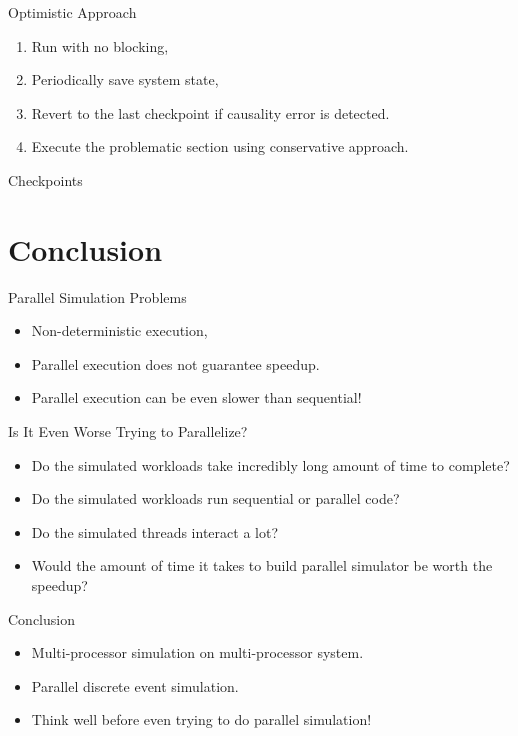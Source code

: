 \begin{frame}{Optimistic Approach}
  \begin{enumerate}
    \item Run with no blocking,
    \item Periodically save system state,
    \item Revert to the last checkpoint if causality error is detected.
    \item Execute the problematic section using conservative approach.
  \end{enumerate}
\end{frame}

\begin{frame}{Checkpoints}
  \centering
\end{frame}

\section*{Conclusion}

\begin{frame}{Parallel Simulation Problems}
  \begin{itemize}
    \item Non-deterministic execution,
    \item Parallel execution does not guarantee speedup. \pause
    \item Parallel execution can be even slower than sequential!
  \end{itemize}
\end{frame}

\begin{frame}{Is It Even Worse Trying to Parallelize?}
  \begin{itemize}
    \item Do the simulated workloads take incredibly long amount of time to
      complete?
    \item Do the simulated workloads run sequential or parallel code?
    \item Do the simulated threads interact a lot? \pause
    \item Would the amount of time it takes to build parallel simulator be
      worth the speedup?
  \end{itemize}
\end{frame}

\begin{frame}{Conclusion}
  \begin{itemize}
    \item Multi-processor simulation on multi-processor system.
    \item Parallel discrete event simulation. \pause
    \item Think well before even trying to do parallel simulation!
  \end{itemize}
\end{frame}

